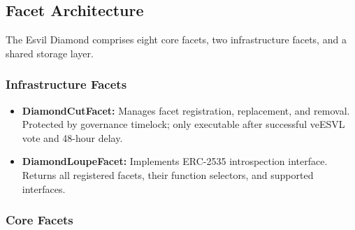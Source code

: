 \documentclass[11pt,a4paper]{article}
\begin{document}
\subsection{Facet Architecture}

The Esvil Diamond comprises eight core facets, two infrastructure facets, and a shared storage layer.

\subsubsection{Infrastructure Facets}

\begin{itemize}[nosep]
    \item \textbf{DiamondCutFacet:} Manages facet registration, replacement, and removal. Protected by governance timelock; only executable after successful veESVL vote and 48-hour delay.
    \item \textbf{DiamondLoupeFacet:} Implements ERC-2535 introspection interface. Returns all registered facets, their function selectors, and supported interfaces.
\end{itemize}

\subsubsection{Core Facets}
\end{document}

